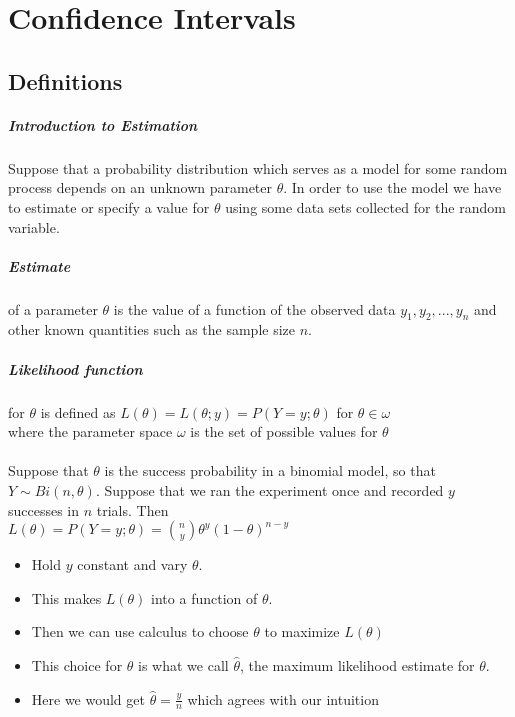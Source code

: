 \chapter{Confidence Intervals}
  \section{Definitions}
    \paragraph{Introduction to Estimation}
      Suppose that a probability distribution which serves as a model for some
      random process depends on an unknown parameter $\theta$. In order to use
      the model we have to estimate or specify a value for $\theta$ using some
      data sets collected for the random variable.\\

    \paragraph{Estimate} of a parameter $\theta$ is the value of a function of
    the observed data $y_1, y_2, ... , y_n$ and other known quantities such as
    the sample size $n$.

    \paragraph{Likelihood function} for $\theta$ is defined as $L(\theta) =
    L(\theta ; y) = P(Y = y ; \theta )$ for $\theta \in \omega$\\
    where the parameter space $\omega$ is the set of possible values for
    $\theta$\\
    \\
    Suppose that $\theta$ is the success probability in a binomial model, so
    that $Y \sim Bi(n, \theta )$. Suppose that we ran the experiment once and
    recorded $y$ successes in $n$ trials. Then \\
    $L(\theta ) = P(Y = y ; \theta ) = \binom{n}{y} \theta^y (1 - \theta) ^
    {n-y}$\\
    \begin{itemize}
      \item Hold $y$ constant and vary $\theta$.
      \item This makes $L(\theta)$ into a function of $\theta$.
      \item Then we can use calculus to choose $\theta$ to maximize $L(\theta)$
      \item This choice for $\theta$ is what we call $\hat{\theta}$, the
        maximum likelihood estimate for $\theta$.
      \item Here we would get $\hat{\theta} = \frac{y}{n}$ which agrees with
        our intuition
    \end{itemize}

